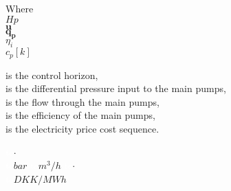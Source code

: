 
\begin{minipage}[t]{0.20\textwidth}
Where\\
 \hspace*{8mm} $Hp$ \\
\hspace*{8mm} $\bm{u}$ \\
\hspace*{8mm} $\bm{q_p}$ \\
 \hspace*{8mm} $\eta_i$ \\
\hspace*{8mm} $c_p[k]$ 
\end{minipage}
\begin{minipage}[t]{0.68\textwidth}
\vspace*{2mm}
 is the control horizon, \\
is the differential pressure input to the main pumps,\\
is the flow through the main pumps,\\
is the efficiency of the main pumps,\\
is the electricity price cost sequence.
\end{minipage}
\begin{minipage}[t]{0.10\textwidth}
\vspace*{2mm}
 \textcolor{White}{te}$\unit{\cdot}$\\
\textcolor{White}{te}$\unit{bar}$
\textcolor{White}{te}$\unit{m^3/h}$
 \textcolor{White}{te}$\unit{\cdot}$\\
\textcolor{White}{te}$\unit{DKK/MWh}$
\end{minipage}

